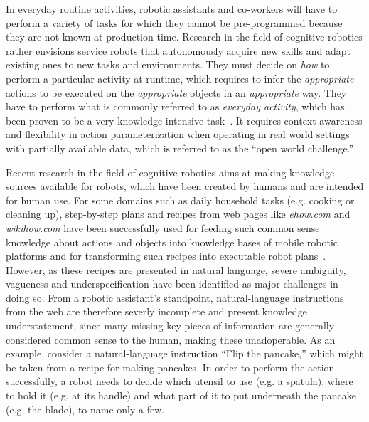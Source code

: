 \documentclass[oribibl]{llncs}
\begin{document}
In everyday routine activities, robotic assistants and co-workers 
will have to perform a variety of tasks for which they cannot be 
pre-programmed because they are not known at production time. 
Research in the field of cognitive robotics rather envisions service 
robots that autonomously acquire new skills and adapt existing ones 
to new tasks and environments. They must decide on \textit{how} to 
perform a particular activity at runtime, which requires to infer 
the \textit{appropriate} actions to be executed on the \textit 
{appropriate} objects in an \textit{appropriate} way. They have to 
perform what is commonly referred to as \textit{everyday activity}, 
which has been proven to be a very knowledge-intensive task~\cite 
{anderson95phd, nyga12actioncore}. It requires context awareness and 
flexibility in action parameterization when operating in real world 
settings with partially available data, which is referred to as the 
``open world challenge.'' 

Recent research in the field of cognitive robotics aims at making 
knowledge sources available for robots, which have been created by 
humans and are intended for human use. For some domains such as 
daily household tasks (e.g. cooking or cleaning up), step-by-step 
plans and recipes from web pages like \textit {ehow.com} and \textit 
{wikihow.com} have been successfully used for feeding such common 
sense knowledge about actions and objects into knowledge bases of 
mobile robotic platforms and for transforming such recipes into 
executable robot plans~\cite{tenorth10webinstructions}. However, as 
these recipes are presented in natural language, severe ambiguity, 
vagueness and underspecification have been identified as major 
challenges in doing so. From a robotic assistant's standpoint, 
natural-language instructions from the web are therefore severly 
incomplete and present knowledge understatement, since many missing 
key pieces of information are generally considered common sense to 
the human, making these unadoperable.
As an example, consider a natural-language instruction ``Flip the 
pancake,'' which might be taken from a recipe for making pancakes. 
In order to perform the action successfully, a robot needs to decide 
which utensil to use (e.g. a spatula), where to hold it (e.g. at its 
handle) and what part of it to put underneath the pancake (e.g. the 
blade), to name only a few.
\end{document}

